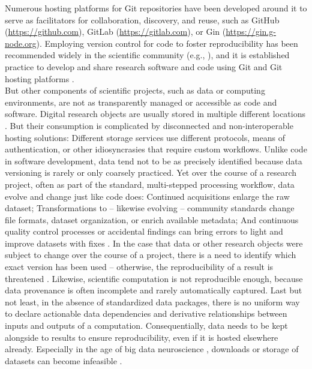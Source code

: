 Numerous hosting platforms for Git repositories have been developed around it to serve as facilitators for collaboration, discovery, and reuse, such as GitHub (\url{https://github.com}), GitLab ({\url{https://gitlab.com}), or Gin (\url{https://gin.g-node.org}).
Employing version control for code to foster reproducibility has been recommended widely in the scientific community (e.g., \cite{sandve2013ten}), and it is established practice to develop and share research software and code using Git and Git hosting platforms \citep[e.g.,][]{nord2019towards, strupler2017reproducibility, bryan2018excuse, corti2019managing}. \\
But other components of scientific projects, such as data or computing environments, are not as transparently managed or accessible as code and software.
Digital research objects are usually stored in multiple different locations \citep{parsons2013research}.
But their consumption is complicated by disconnected and non-interoperable hosting solutions:
Different storage services use different protocols, means of authentication, or other idiosyncrasies that require custom workflows.
Unlike code in software development, data tend not to be as precisely identified because data versioning is rarely or only coarsely practiced.
Yet over the course of a research project, often as part of the standard, multi-stepped processing workflow, data evolve and change just like code does:
Continued acquisitions enlarge the raw dataset; Transformations to -- likewise evolving -- community standards change file formats, dataset organization, or enrich available metadata; And continuous quality control processes or accidental findings can bring errors to light and improve datasets with fixes \citep{markiewicz2021openneuro}.
In the case that data or other research objects were subject to change over the course of a project, there is a need to identify which exact version has been used -- otherwise, the reproducibility of a result is threatened \citep{hardwicke2018data}.
Likewise, scientific computation is not reproducible enough, because data provenance is often incomplete and rarely automatically captured.
Last but not least, in the absence of standardized data packages, there is no uniform way to declare actionable
data dependencies and derivative relationships between inputs and outputs of a computation.
Consequentially, data needs to be kept alongside to results to ensure reproducibility, even if it is hosted elsewhere already.
Especially in the age of big data neuroscience \citep{bzdok2017inference}, downloads or storage of datasets can become infeasible \citep{horien2021hitchhiker, grisham2016proposed}.
}
